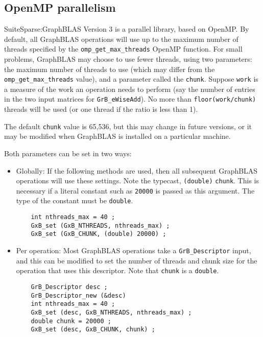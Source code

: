 \documentclass[12pt]{article}
\begin{document}
\subsection{OpenMP parallelism}

SuiteSparse:GraphBLAS Version 3 is a parallel library, based on OpenMP.  By
default, all GraphBLAS operations will use up to the maximum number of threads
specified by the \verb'omp_get_max_threads' OpenMP function.  For small
problems, GraphBLAS may choose to use fewer threads, using two parameters: the
maximum number of threads to use (which may differ from the
\verb'omp_get_max_threads' value), and a parameter called the \verb'chunk'.
Suppose \verb'work' is a measure of the work an operation needs to perform (say
the number of entries in the two input matrices for \verb'GrB_eWiseAdd').  No
more than \verb'floor(work/chunk)' threads will be used (or one thread if the
ratio is less than 1).

The default \verb'chunk' value is 65,536, but this may change in future versions,
or it may be modified when GraphBLAS is installed on a particular machine.

Both parameters can be set in two ways:

\begin{itemize}

\item Globally:  If the following methods are used, then all subsequent
GraphBLAS operations will use these settings.  Note the typecast,
\verb'(double)' \verb'chunk'.  This is necessary if a literal constant such as
\verb'20000' is passed as this argument.  The type of the constant must be
\verb'double'.

    {\footnotesize
    \begin{verbatim}
    int nthreads_max = 40 ;
    GxB_set (GxB_NTHREADS, nthreads_max) ;
    GxB_set (GxB_CHUNK, (double) 20000) ; \end{verbatim} }

\item Per operation:  Most GraphBLAS operations take a \verb'GrB_Descriptor'
input, and this can be modified to set the number of threads and chunk
size for the operation that uses this descriptor.  Note that \verb'chunk'
is a \verb'double'.

    {\footnotesize
    \begin{verbatim}
    GrB_Descriptor desc ;
    GrB_Descriptor_new (&desc)
    int nthreads_max = 40 ;
    GxB_set (desc, GxB_NTHREADS, nthreads_max) ;
    double chunk = 20000 ;
    GxB_set (desc, GxB_CHUNK, chunk) ; \end{verbatim} }

\end{itemize}
\end{document}
